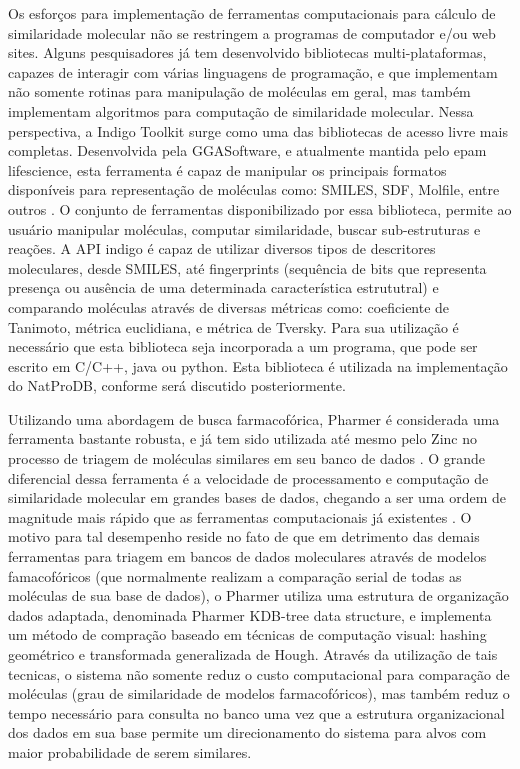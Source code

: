 Os esforços para implementação de ferramentas computacionais para cálculo de similaridade molecular não se restringem a programas de computador e/ou web sites. Alguns pesquisadores já tem desenvolvido bibliotecas multi-plataformas, capazes de interagir com várias linguagens de programação, e que implementam não somente rotinas para manipulação de moléculas em geral, mas também implementam algoritmos para computação de similaridade molecular. Nessa perspectiva, a Indigo Toolkit surge como uma das bibliotecas de acesso livre mais completas. Desenvolvida pela GGASoftware, e atualmente mantida pelo epam lifescience, esta ferramenta é capaz de manipular os principais formatos disponíveis para representação de moléculas como: SMILES, SDF, Molfile, entre outros \cite{pavlov2011indigo}. O conjunto de ferramentas disponibilizado por essa biblioteca, permite ao usuário manipular moléculas, computar similaridade, buscar sub-estruturas e reações. A API indigo é capaz de utilizar diversos tipos de descritores moleculares, desde SMILES, até fingerprints (sequência de bits que representa presença ou ausência de uma determinada característica estrututral) e comparando moléculas através de diversas métricas como: coeficiente de Tanimoto, métrica euclidiana, e métrica de Tversky. Para sua utilização é necessário que esta biblioteca seja incorporada a um programa, que pode ser escrito em C/C++, java ou python. Esta biblioteca é utilizada na implementação do NatProDB, conforme será discutido posteriormente.

Utilizando uma abordagem de busca farmacofórica, Pharmer é considerada uma ferramenta bastante robusta, e já tem sido utilizada até mesmo pelo Zinc no processo de triagem de moléculas similares em seu banco de dados \cite{koes2011pharmer}. O grande diferencial dessa ferramenta é a velocidade de processamento e computação de similaridade molecular em grandes bases de dados, chegando a ser uma ordem de magnitude mais rápido que as ferramentas computacionais já existentes \cite{koes2011pharmer}. O motivo para tal desempenho reside no fato de que em detrimento das demais ferramentas para triagem em bancos de dados moleculares através de modelos famacofóricos (que normalmente realizam a comparação serial de todas as moléculas de sua base de dados), o Pharmer utiliza uma estrutura de organização dados adaptada, denominada Pharmer KDB-tree data structure, e implementa um método de compração baseado em técnicas de computação visual: hashing geométrico e transformada generalizada de Hough. Através da utilização de tais tecnicas, o sistema não somente reduz o custo computacional para comparação de moléculas (grau de similaridade de modelos farmacofóricos), mas também reduz o tempo necessário para consulta no banco uma vez que a estrutura organizacional dos dados em sua base permite um direcionamento do sistema para alvos com maior probabilidade de serem similares.

